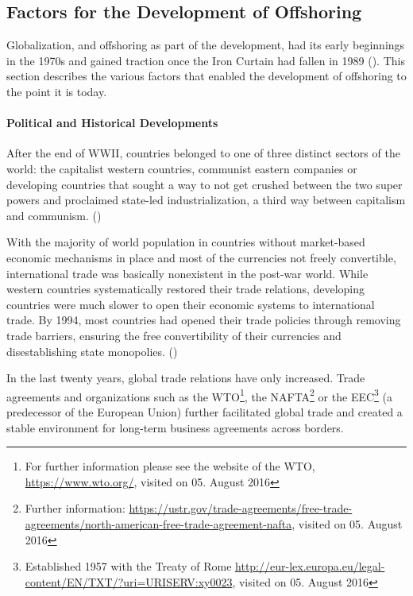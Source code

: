 \subsection{Factors for the Development of Offshoring}

Globalization, and offshoring as part of the development, had its early beginnings in the 1970s and gained traction once the Iron Curtain had fallen in 1989 (\cite[p. 1]{Sachs.1995}). This section describes the various factors that enabled the development of offshoring to the point it is today.

\paragraph{Political and Historical Developments}
After the end of \ac{WWII}, countries belonged to one of three distinct sectors of the world: the capitalist western countries, communist eastern companies or developing countries that sought a way to not get crushed between the two super powers and proclaimed state-led industrialization, a third way between capitalism and communism. (\cite[pp. 12f]{Sachs.1995})

With the majority of world population in countries without market-based economic mechanisms in place and most of the currencies not freely convertible, international trade was basically nonexistent in the post-war world. While western countries systematically restored their trade relations, developing countries were much slower to open their economic systems to international trade. By 1994, most countries had opened their trade policies through removing trade barriers, ensuring the free convertibility of their currencies and disestablishing state monopolies. (\cite[pp. 12-25]{Sachs.1995})

In the last twenty years, global trade relations have only increased. Trade agreements and organizations such as the \ac{WTO}\footnote{For further information please see the website of the WTO, \url{https://www.wto.org/}, visited on 05. \nolinebreak August 2016}, the \ac{NAFTA}\footnote{Further information: \url{https://ustr.gov/trade-agreements/free-trade-agreements/north-american-free-trade-agreement-nafta}, visited on 05. August 2016} or  the \ac{EEC}\footnote{Established 1957 with the Treaty of Rome \url{http://eur-lex.europa.eu/legal-content/EN/TXT/?uri=URISERV:xy0023}, visited on 05. August 2016} (a predecessor of the European Union) further facilitated global trade and created a stable environment for long-term business agreements across borders. 


